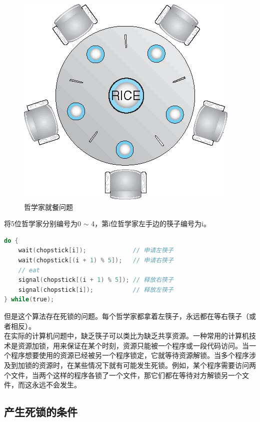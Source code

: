 \begin{figure}[H]
    \centering
    \includegraphics[]{img/C2/2-8/2.png}
    \caption{哲学家就餐问题}
\end{figure}

将5位哲学家分别编号为0 $\sim $ 4，第i位哲学家左手边的筷子编号为i。

\vspace{-0.5cm}

\begin{lstlisting}[language=C]
do {
	wait(chopstick[i]);				// 申请左筷子
	wait(chopstick[(i + 1) % 5]);	// 申请右筷子
	// eat
	signal(chopstick[(i + 1) % 5]); // 释放右筷子
	signal(chopstick[i]);			// 释放左筷子
} while(true);
\end{lstlisting}

但是这个算法存在死锁的问题。每个哲学家都拿着左筷子，永远都在等右筷子（或者相反）。\\

在实际的计算机问题中，缺乏筷子可以类比为缺乏共享资源。一种常用的计算机技术是资源加锁，用来保证在某个时刻，资源只能被一个程序或一段代码访问。当一个程序想要使用的资源已经被另一个程序锁定，它就等待资源解锁。当多个程序涉及到加锁的资源时，在某些情况下就有可能发生死锁。例如，某个程序需要访问两个文件，当两个这样的程序各锁了一个文件，那它们都在等待对方解锁另一个文件，而这永远不会发生。\\

\subsection{产生死锁的条件}

